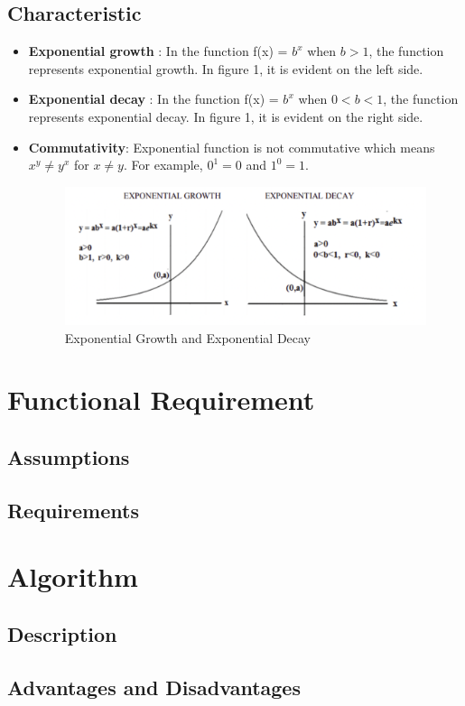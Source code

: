 \documentclass[12pt]{report}
\begin{document}
\subsection{Characteristic}
\begin{itemize}


  \item \textbf{Exponential growth} : In the function  f(x) = $b^{x}$ when  $b > 1$, the function represents exponential growth. In figure 1, it is evident on the left side. 

  \item \textbf{Exponential decay} : In the function  f(x) = $b^{x}$ when  $0 < b < 1$, the function represents exponential decay. In figure 1, it is evident on the right side. 
  
   \item \textbf{Commutativity}:  Exponential function is not commutative which means $x^y \ne y^x $ for $x\ne y$. For example, $0^1 = 0$ and $1^0 = 1$.
   
\begin{figure}
\includegraphics[width=15cm]{ExponentialGrowthandDecay.png}
\caption{Exponential Growth and Exponential Decay}
\label{exp}
\end{figure}



\end{itemize}

\section{Functional Requirement}
\subsection{Assumptions}
\subsection{Requirements}
\section{Algorithm}
\subsection{Description}
\subsection{Advantages and Disadvantages}
\end{document}
